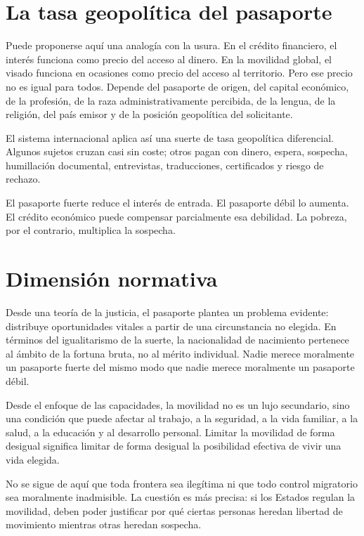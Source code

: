 \documentclass[12pt,a4paper]{article}
\begin{document}
\section*{La tasa geopolítica del pasaporte}

Puede proponerse aquí una analogía con la usura. En el crédito financiero, el interés funciona como precio del acceso al dinero. En la movilidad global, el visado funciona en ocasiones como precio del acceso al territorio. Pero ese precio no es igual para todos. Depende del pasaporte de origen, del capital económico, de la profesión, de la raza administrativamente percibida, de la lengua, de la religión, del país emisor y de la posición geopolítica del solicitante.

El sistema internacional aplica así una suerte de tasa geopolítica diferencial. Algunos sujetos cruzan casi sin coste; otros pagan con dinero, espera, sospecha, humillación documental, entrevistas, traducciones, certificados y riesgo de rechazo.

El pasaporte fuerte reduce el interés de entrada. El pasaporte débil lo aumenta. El crédito económico puede compensar parcialmente esa debilidad. La pobreza, por el contrario, multiplica la sospecha.

\section*{Dimensión normativa}

Desde una teoría de la justicia, el pasaporte plantea un problema evidente: distribuye oportunidades vitales a partir de una circunstancia no elegida. En términos del igualitarismo de la suerte, la nacionalidad de nacimiento pertenece al ámbito de la fortuna bruta, no al mérito individual. Nadie merece moralmente un pasaporte fuerte del mismo modo que nadie merece moralmente un pasaporte débil.

Desde el enfoque de las capacidades, la movilidad no es un lujo secundario, sino una condición que puede afectar al trabajo, a la seguridad, a la vida familiar, a la salud, a la educación y al desarrollo personal. Limitar la movilidad de forma desigual significa limitar de forma desigual la posibilidad efectiva de vivir una vida elegida.

No se sigue de aquí que toda frontera sea ilegítima ni que todo control migratorio sea moralmente inadmisible. La cuestión es más precisa: si los Estados regulan la movilidad, deben poder justificar por qué ciertas personas heredan libertad de movimiento mientras otras heredan sospecha.
\end{document}
